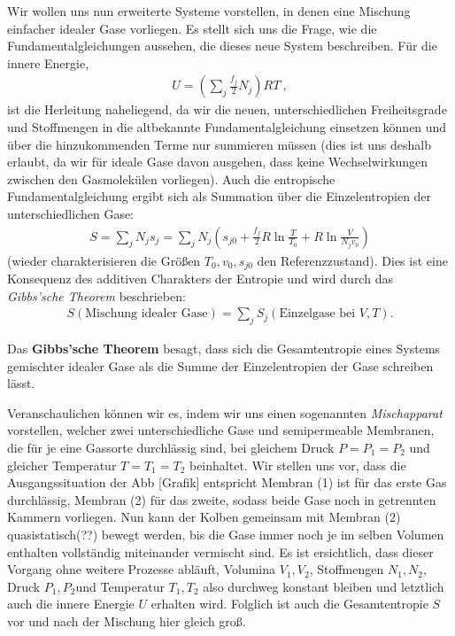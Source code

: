Wir wollen uns nun erweiterte Systeme vorstellen, in denen eine Mischung einfacher idealer Gase vorliegen. Es stellt sich uns die Frage, wie die Fundamentalgleichungen aussehen, die dieses neue System beschreiben. Für die innere Energie,
\begin{align*}
    \boxed{U=\left(\sum_j\frac{f_j}{2}N_j\right)RT}\:,
\end{align*}
ist die Herleitung naheliegend, da wir die neuen, unterschiedlichen Freiheitsgrade und Stoffmengen in die altbekannte Fundamentalgleichung einsetzen können und über die hinzukommenden Terme nur summieren müssen (dies ist uns deshalb erlaubt, da wir für ideale Gase davon ausgehen, dass keine Wechselwirkungen zwischen den Gasmolekülen vorliegen). Auch die entropische Fundamentalgleichung ergibt sich als Summation über die Einzelentropien der unterschiedlichen Gase:
\begin{align*}
    \boxed{S=\sum_jN_js_j=\sum_jN_j\left(s_{j0}+\frac{f_j}{2}R\ln\frac{T}{T_0}+R\ln\frac{V}{N_jv_0}\right)}
\end{align*}
(wieder charakterisieren die Größen $T_0,v_0,s_{j0}$ den Referenzzustand).
Dies ist eine Konsequenz des additiven Charakters der Entropie und wird durch das \emph{Gibbs'sche Theorem} beschrieben:
\begin{align*}
    \boxed{S(\text{Mischung idealer Gase})=\sum_jS_j(\text{Einzelgase bei } V,T)}.
\end{align*}
\begin{formal}
    Das \textbf{Gibbs'sche Theorem} besagt, dass sich die Gesamtentropie eines Systems gemischter idealer Gase als die Summe der Einzelentropien der Gase schreiben lässt.
\end{formal}
Veranschaulichen können wir es, indem wir uns einen sogenannten \emph{Mischapparat} vorstellen, welcher zwei unterschiedliche Gase und semipermeable Membranen, die für je eine Gassorte durchlässig sind, bei gleichem Druck $P=P_1=P_2$ und gleicher Temperatur $T=T_1=T_2$ beinhaltet. Wir stellen uns vor, dass die Ausgangssituation der Abb [Grafik] entspricht \textendash{} Membran (1) ist für das erste Gas durchlässig, Membran (2) für das zweite, sodass beide Gase noch in getrennten Kammern vorliegen. Nun kann der Kolben gemeinsam mit
Membran (2) quasistatisch(??) bewegt werden, bis die Gase \textendash{} immer noch je im selben Volumen enthalten \textendash{} vollständig miteinander vermischt sind. Es ist ersichtlich, dass dieser Vorgang ohne weitere Prozesse abläuft, Volumina $V_1,V_2$, Stoffmengen $N_1,N_2$, Druck $P_1,P_2$und Temperatur $T_1,T_2$ also durchweg konstant bleiben und letztlich auch die innere Energie $U$ erhalten wird. Folglich ist auch die Gesamtentropie $S$ vor und nach der Mischung hier gleich groß.
